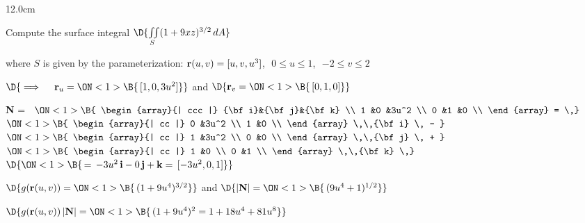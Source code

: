 \begin{frame}
\begin{columns}\begin{column}{12.0cm}
\scriptsize

\EX Compute the surface integral \qquad $\D{\iint \limits_{S} (1 + 9xz)^{3/2}\, dA}$

\vspace{0.1cm}

where $S$ is given by the parameterization: ${\bf r}(u,v) = [u,v,u^3]$,\,\, $0 \le u \le 1$,\,\, $-2 \le v \le 2$

\vspace{0.2cm}

$\D{
\implies \quad {\bf r}_u =
\ON<1>{\B{\, [1,0,3u^2]}}}$ \qquad 
and
\qquad $\D{
{\bf r}_v = 
\ON<1>{\B{\,[0,1,0]}}}$

\vspace{0.3cm}

{\bf N} = \,
$\ON<1>{\B{
\begin{array}{| ccc |}
	{\bf i}&{\bf j}&{\bf k} \\
	1 &0 &3u^2 \\
 	0 &1 &0 \\
\end{array}
= \,}}$
$\ON<1>{\B{
\begin{array}{| cc |}
	0 &3u^2 \\
 	1 &0 \\
\end{array}
 \,\,{\bf i} \, - }}$\,\,
$\ON<1>{\B{
\begin{array}{| cc |}
	1 &3u^2 \\
 	0 &0 \\
\end{array}
 \,\,{\bf j} \, + }}$\,\,
$\ON<1>{\B{
\begin{array}{| cc |}
	1 &0 \\
 	0 &1 \\
\end{array}
\,\,{\bf k} \,}}$
$\D{
\ON<1>{\B{\, = \, -3u^2 \,{\bf i} - 0\,{\bf j} + {\bf k} = \, [-3u^2,0,1]}}}$

\vspace{0.4cm}

$\D{g({\bf r}(u,v)) = 
\ON<1>{\B{\,(1+9u^4)^{3/2}}}}$
\quad and \quad 
$\D{|{\bf N}| = 
\ON<1>{\B{\,(9u^4+1)^{1/2}}}}$

\vspace{0.3cm}

$\D{g({\bf r}(u,v))\, |{\bf N}| = 
\ON<1>{\B{\,(1+9u^4)^2 = 1 + 18u^4 + 81u^8}}}$


\end{column}
\end{columns}
\end{frame}
